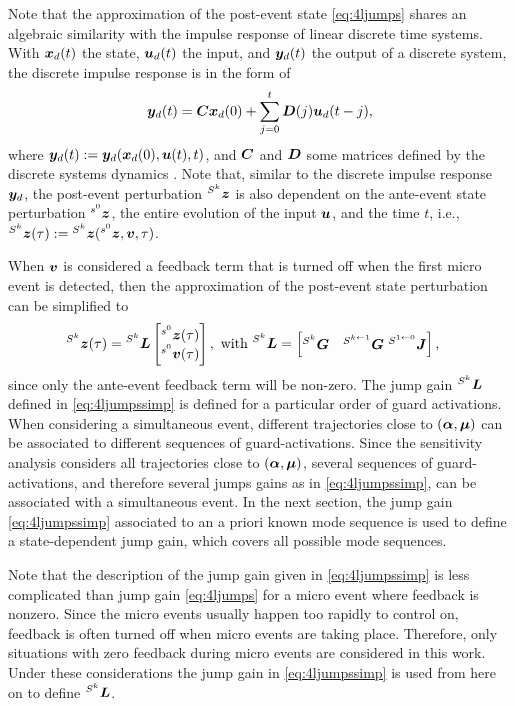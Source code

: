 \documentclass[../DC2017114Bouma.tex]{subfiles}
\begin{document}
Note that the approximation of the post-event state \eqref{eq:4ljumps} shares an algebraic similarity with the impulse response of linear discrete time systems. With ${\boldsymbol{x}}_d(t)$ the state, ${\boldsymbol{u}}_d(t)$ the input, and ${\boldsymbol{y}}_d(t)$ the output of a discrete system, the discrete impulse response is in the form of
\begin{align}
{\boldsymbol{y}}_d(t) = {\boldsymbol{C}}{\boldsymbol{x}}_d(0) + \sum_{j=0}^t{\boldsymbol{D}}(j){\boldsymbol{u}}_d(t-j),
\end{align}
where ${\boldsymbol{y}}_d(t) :=  {\boldsymbol{y}}_d({\boldsymbol{x}}_d(0),{\boldsymbol{u}}(t),t)$, and ${\boldsymbol{C}}$ and ${\boldsymbol{D}}$ some matrices defined by the discrete systems dynamics \cite{Hespanha2009}. Note that, similar to the discrete impulse response ${\boldsymbol{y}}_d$, the post-event perturbation $\hspace{0cm}^{S^k}{\boldsymbol{z}}$ is also dependent on the ante-event state perturbation $\hspace{0cm}^{s^0}{\boldsymbol{z}}$, the entire evolution of the input ${\boldsymbol{u}}$, and the time $t$, i.e., $\hspace{0cm}^{S^k}{\boldsymbol{z}}(\tau) := \hspace{0cm}^{S^k}{\boldsymbol{z}}(\hspace{0cm}^{s^0}{\boldsymbol{z}},{\boldsymbol{v}},\tau)$.

When ${\boldsymbol{v}}$ is considered a feedback term that is turned off when the first micro event is detected, then the approximation of the post-event state perturbation can be simplified to
\begin{align}
\hspace{0cm}^{S^k}{\boldsymbol{z}}(\tau) &= \hspace{0cm}^{S^k}{\boldsymbol{L}} \begin{bmatrix}
\hspace{0cm}^{s^0}{\boldsymbol{z}}(\tau) \\ \hspace{0cm}^{s^0}{\boldsymbol{v}}(\tau)
\end{bmatrix}, \text{ with }\hspace{0cm}^{S^k}{\boldsymbol{L}} = \begin{bmatrix}
\hspace{0cm}^{S^k}{\boldsymbol{G}} & \hspace{0cm}^{S^{k\leftarrow 1}}{\boldsymbol{G}}\ \hspace{0cm}^{S^{1\leftarrow 0}}{\boldsymbol{J}}
\end{bmatrix},\label{eq:4ljumpssimp}
\end{align}
since only the ante-event feedback term will be non-zero. The jump gain $\hspace{0cm}^{S^k}{\boldsymbol{L}}$ defined in \eqref{eq:4ljumpssimp} is defined for a particular order of guard activations. When considering a simultaneous event, different trajectories close to $(\boldsymbol{\alpha},\boldsymbol{\mu})$ can be associated to different sequences of guard-activations. Since the sensitivity analysis considers all trajectories close to $(\boldsymbol{\alpha},\boldsymbol{\mu})$, several sequences of guard-activations, and therefore several jumps gains as in \eqref{eq:4ljumpssimp}, can be associated with a simultaneous event. In the next section, the jump gain \eqref{eq:4ljumpssimp} associated to an a priori known mode sequence is used to define a state-dependent jump gain, which covers all possible mode sequences. 

Note that the description of the jump gain given in \eqref{eq:4ljumpssimp} is less complicated than jump gain \eqref{eq:4ljumps} for a micro event where feedback is nonzero. Since the micro events usually happen too rapidly to control on, feedback is often turned off when micro events are taking place. Therefore, only situations with zero feedback during micro events are considered in this work. Under these considerations the jump gain in \eqref{eq:4ljumpssimp} is used from here on to define $\hspace{0cm}^{S^k}{\boldsymbol{L}}$.
\end{document}
